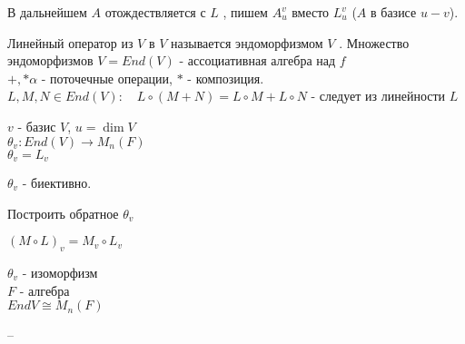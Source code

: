 \documentclass[12pt]{report}
\begin{document}
В дальнейшем $A$ отождествляется с $L$ , пишем $A_u ^v $ вместо $L_u ^v$ ($A$ в базисе $u-v$). 
\begin{defn}
Линейный оператор  из $V $ в  $V$ называется эндоморфизмом $V$ .
Множество эндоморфизмов $V = End(V)$ - ассоциативная алгебра над $f$\\
$+, *\alpha$ - поточечные операции, $*$ - композиция.\\
$L, M, N \in End(V): \quad L\circ (M + N) = L \circ M + L \circ N$ - следует из линейности  $L$
\end{defn}
$v$  - базис $V$, $u = \dim V$ \\
$\theta _v : End(V) \to M_n (F)$ \\
$\theta _v = L_v$
\begin{st}
    $\theta_v$ -  биективно.
\end{st}
\begin{probl}
    Построить обратное $\theta_v$
\end{probl}

\begin{lm}
    $(M \circ L)_v = M_v \circ L_v$
\end{lm}
 \begin{st}
     $\theta _v$ - изоморфизм \\ $F$ - алгебра \\ $End V \cong M_n(F)$
\end{st}

--
\end{document}
